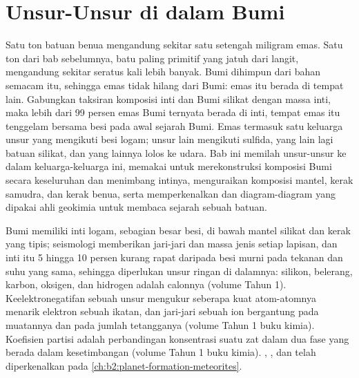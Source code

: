 \chapter{Unsur-Unsur di dalam Bumi}\label{ch:b2:elements-in-the-earth}

Satu ton batuan benua mengandung sekitar satu setengah miligram
emas. Satu ton  dari bab sebelumnya, batu paling
primitif yang jatuh dari langit, mengandung sekitar seratus kali lebih banyak. Bumi
dihimpun dari bahan semacam itu, sehingga emas tidak hilang dari
Bumi: emas itu berada di tempat lain. Gabungkan taksiran komposisi inti dan
Bumi silikat dengan massa inti, maka lebih dari 99 persen emas
Bumi ternyata berada di inti, tempat emas itu tenggelam bersama besi pada awal
sejarah Bumi. Emas termasuk satu keluarga unsur yang mengikuti besi
logam; unsur lain mengikuti sulfida, yang lain lagi batuan silikat, dan yang lainnya lolos
ke udara. Bab ini memilah unsur-unsur ke dalam keluarga-keluarga ini, memakai
 untuk merekonstruksi komposisi Bumi secara keseluruhan dan menimbang
intinya, menguraikan komposisi mantel, kerak samudra, dan
kerak benua, serta memperkenalkan  dan diagram-diagram yang dipakai
ahli geokimia untuk membaca sejarah sebuah batuan.

\begin{recall}
Bumi memiliki inti logam, sebagian besar besi, di bawah mantel silikat dan kerak
yang tipis; seismologi memberikan jari-jari dan massa jenis setiap lapisan, dan inti itu
5 hingga 10 persen kurang rapat daripada besi murni pada tekanan dan suhu yang sama,
sehingga diperlukan unsur ringan di dalamnya: silikon, belerang, karbon,
oksigen, dan hidrogen adalah calonnya (volume Tahun 1). Keelektronegatifan
sebuah unsur mengukur seberapa kuat atom-atomnya menarik
elektron sebuah ikatan, dan jari-jari sebuah ion bergantung pada muatannya dan pada
jumlah tetangganya (volume Tahun 1 buku kimia). Koefisien
partisi adalah perbandingan konsentrasi suatu zat dalam dua fase yang berada dalam
kesetimbangan (volume Tahun 1 buku kimia). , , dan  telah diperkenalkan pada
\cref{ch:b2:planet-formation-meteorites}.
\end{recall}

